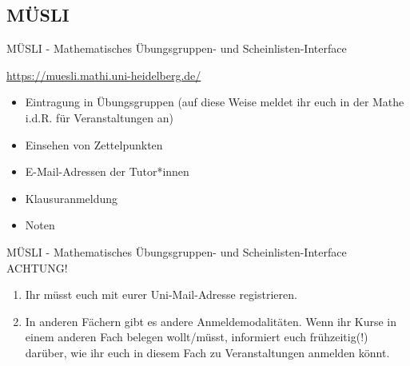 
\subsection{MÜSLI}
\begin{frame}{MÜSLI - Mathematisches Übungsgruppen- und Scheinlisten-Interface}

    \url{https://muesli.mathi.uni-heidelberg.de/}

    \begin{center}
    \end{center}

    \begin{itemize}
        \item{Eintragung in Übungsgruppen (auf diese Weise meldet ihr euch in der Mathe i.d.R. für Veranstaltungen an)}
        \item{Einsehen von Zettelpunkten}
        \item{E-Mail-Adressen der Tutor*innen}
        \item{Klausuranmeldung}
        \item{Noten}
    \end{itemize}
\end{frame}

\begin{frame}{MÜSLI - Mathematisches Übungsgruppen- und Scheinlisten-Interface}
    ACHTUNG!\\
    \begin{enumerate}
        \item{Ihr müsst euch mit eurer Uni-Mail-Adresse registrieren.}
        \item{In anderen Fächern gibt es andere Anmeldemodalitäten. Wenn ihr Kurse in einem anderen Fach belegen wollt/müsst, informiert euch frühzeitig(!) darüber, wie ihr euch in diesem Fach zu Veranstaltungen anmelden könnt.}
    \end{enumerate}
\end{frame}



